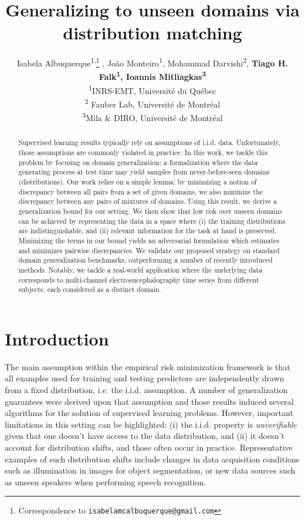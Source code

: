 \documentclass{article}
\title{Generalizing to unseen domains via distribution matching}
\author{Isabela Albuquerque\textsuperscript{1,}\thanks{Correspondence to \texttt{isabelamcalbuquerque@gmail.com}} , Jo\~ao Monteiro\textsuperscript{1}, Mohammad Darvishi\textsuperscript{2}, \textbf{Tiago H. Falk\textsuperscript{1}, Ioannis Mitliagkas\textsuperscript{3}}   
\\
\textsuperscript{1}INRS-EMT, Universit\'e du Qu\'ebec\\
\textsuperscript{2} Fauber Lab, Universit\'e de Montr\'eal \\ 
\textsuperscript{3}Mila \& DIRO, Universit\'e de Montr\'eal}
\begin{document}
\maketitle

\begin{abstract}






Supervised learning results typically rely on assumptions of i.i.d. data. Unfortunately, those assumptions are commonly violated in practice. In this work, we tackle this problem by focusing on domain generalization: a formalization where the data generating process at test time may yield samples from never-before-seen domains (distributions).
Our work relies on a simple lemma: by minimizing a notion of discrepancy between all pairs from a set of given domains, we also minimize the discrepancy between any pairs of mixtures of domains. Using this result, we derive a generalization bound for our setting. We then show that low risk over unseen domains can be achieved by representing the data in a space where (i) the training distributions are indistinguishable, and (ii) relevant information for the task at hand is preserved. Minimizing the terms in our bound yields an adversarial formulation which estimates and minimizes pairwise discrepancies.
We validate our proposed strategy on standard domain generalization benchmarks, outperforming a number of recently introduced methods.
Notably, we tackle a real-world application where the underlying data corresponds to multi-channel electroencephalography time series from different subjects, each considered as a distinct domain.




\end{abstract}

\section{Introduction}

The main assumption within the empirical risk minimization framework is that all examples used for training and testing predictors are independently drawn from a fixed distribution, i.e. the i.i.d. assumption. A number of generalization guarantees were derived upon that assumption and those results induced several algorithms for the solution of supervised learning problems. However, important limitations in this setting can be highlighted: (i) the i.i.d. property is \emph{unverifiable} \cite{langford2005tutorial} given that one doesn't have access to the data distribution, and (ii) it doesn't account for distribution shifts, and those often occur in practice. Representative examples of such distribution shifts include changes in data acquisition conditions such as illumination in images for object segmentation, or new data sources such as unseen speakers when performing speech recognition. \\
\end{document}

